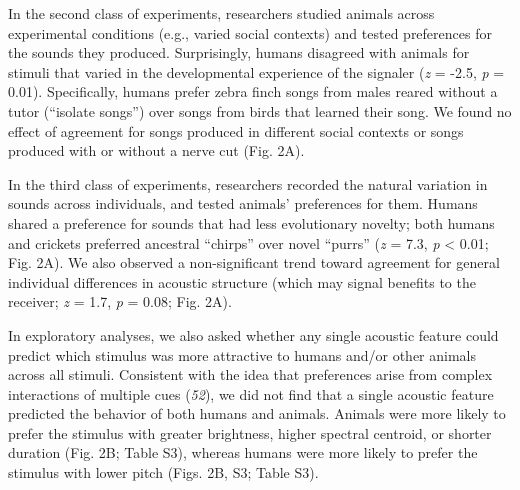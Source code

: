 \documentclass[
]{article}
\begin{document}
In the second class of experiments, researchers studied animals across
experimental conditions (e.g., varied social contexts) and tested
preferences for the sounds they produced. Surprisingly, humans disagreed
with animals for stimuli that varied in the developmental experience of
the signaler (\emph{z} = -2.5, \emph{p} = 0.01). Specifically, humans
prefer zebra finch songs from males reared without a tutor (``isolate
songs'') over songs from birds that learned their song. We found no
effect of agreement for songs produced in different social contexts or
songs produced with or without a nerve cut (Fig. 2A).

In the third class of experiments, researchers recorded the natural
variation in sounds across individuals, and tested animals' preferences
for them. Humans shared a preference for sounds that had less
evolutionary novelty; both humans and crickets preferred ancestral
``chirps'' over novel ``purrs'' (\emph{z} = 7.3, \emph{p} \textless{}
0.01; Fig. 2A). We also observed a non-significant trend toward
agreement for general individual differences in acoustic structure
(which may signal benefits to the receiver; \emph{z} = 1.7, \emph{p} =
0.08; Fig. 2A).

In exploratory analyses, we also asked whether any single acoustic
feature could predict which stimulus was more attractive to humans
and/or other animals across all stimuli. Consistent with the idea that
preferences arise from complex interactions of multiple cues
(\emph{52}), we did not find that a single acoustic feature predicted
the behavior of both humans and animals. Animals were more likely to
prefer the stimulus with greater brightness, higher spectral centroid,
or shorter duration (Fig. 2B; Table S3), whereas humans were more likely
to prefer the stimulus with lower pitch (Figs. 2B, S3; Table S3).
\end{document}
